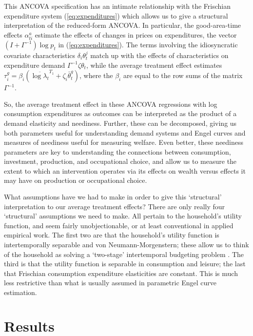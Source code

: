 \documentclass[11pt]{article}
\newcommand{\Eq}[1]{(\ref{eq:#1})}
\begin{document}
This ANCOVA specification has an intimate relationship with the
Frischian expenditure system \Eq{expenditures} which allows us to give
a structural interpretation of the reduced-form ANCOVA.  In
particular, the good-area-time effects $\alpha^a_{ti}$ estimate the
effects of changes in prices on expenditures, the vector
$(I + \Gamma^{-1})\log p_{t}$ in \Eq{expenditures}.  The terms involving
the idiosyncratic covariate characteristics $\delta_i\theta^j_t$ match
up with the effects of characteristics on expenditure demand
$\Gamma^{-1}\zeta\theta_t$, while the average treatment effect
estimates $\tau^g_i=\beta_i(\overline{\log\lambda_t}^{T_1} +
\zeta_i\bar\theta^g_t)$, where the $\beta_i$
are equal to the row sums of the matrix $\Gamma^{-1}$. 

So, the average treatment effect in these ANCOVA regressions with log
consumption expenditures as outcomes can be interpreted as the product
of a demand elasticity and neediness.  Further, these can be
decomposed, giving us both parameters useful for understanding demand
systems and Engel curves and measures of neediness useful for
measuring welfare.  Even better, these neediness parameters are key to
understanding the connections between consumption, investment,
production, and occupational choice, and allow us to measure
the extent to which an intervention operates via its effects on wealth
versus effects it may have on production or occupational choice.

What assumptions have we had to make in order to give this
`structural' interpretation to our average treatment effects?  There
are only really four `structural' assumptions we need to make.  All
pertain to the household's utility function, and seem fairly
unobjectionable, or at least conventional in applied empirical work.
The first two are that the household's utility function is
intertemporally separable and von Neumann-Morgenstern; these allow us
to think of the household as solving a `two-stage' intertemporal
budgeting problem \citep{gorman59}. The third is that the utility function is separable
in consumption and leisure; the last that Frischian consumption
expenditure elasticities are constant.  This is much less restrictive
than what is usually assumed in parametric Engel curve estimation.

\section*{Results}
\label{sec-6}
\end{document}
